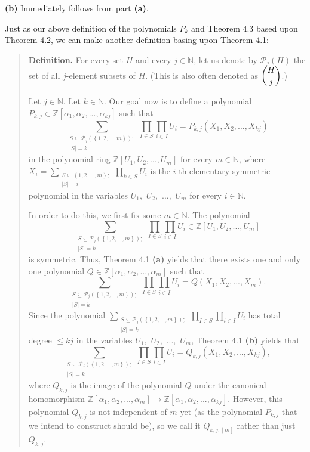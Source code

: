 \documentclass[12pt,final,notitlepage,onecolumn,german]{article}%
\begin{document}
\textbf{(b)} Immediately follows from part \textbf{(a)}.

Just as our above definition of the polynomials $P_{k}$ and Theorem 4.3 based
upon Theorem 4.2, we can make another definition basing upon Theorem 4.1:

\begin{quote}
\textbf{Definition.} For every set $H$ and every $j\in\mathbb{N}$, let us
denote by $\mathcal{P}_{j}\left(  H\right)  $ the set of all $j$-element
subsets of $H.$ (This is also often denoted as $\dbinom{H}{j}$.)

Let $j\in\mathbb{N}$. Let $k\in\mathbb{N}$. Our goal now is to define a
polynomial $P_{k,j}\in\mathbb{Z}\left[  \alpha_{1},\alpha_{2},...,\alpha
_{kj}\right]  $ such that%
\begin{equation}
\sum_{\substack{S\subseteq\mathcal{P}_{j}\left(  \left\{  1,2,...,m\right\}
\right)  ;\\\left\vert S\right\vert =k}}\prod_{I\in S}\prod_{i\in I}%
U_{i}=P_{k,j}\left(  X_{1},X_{2},...,X_{kj}\right)  \label{Pkj1}%
\end{equation}
in the polynomial ring $\mathbb{Z}\left[  U_{1},U_{2},...,U_{m}\right]  $ for
every $m\in\mathbb{N}$, where $X_{i}=\sum\limits_{\substack{S\subseteq\left\{
1,2,...,m\right\}  ;\\\left\vert S\right\vert =i}}\prod\limits_{k\in S}U_{i}$
is the $i$-th elementary symmetric polynomial in the variables $U_{1},$
$U_{2},$ $...,$ $U_{m}$ for every $i\in\mathbb{N}$.

In order to do this, we first fix some $m\in\mathbb{N}$. The polynomial%
\[
\sum_{\substack{S\subseteq\mathcal{P}_{j}\left(  \left\{  1,2,...,m\right\}
\right)  ;\\\left\vert S\right\vert =k}}\prod_{I\in S}\prod_{i\in I}U_{i}%
\in\mathbb{Z}\left[  U_{1},U_{2},...,U_{m}\right]
\]
is symmetric. Thus, Theorem 4.1 \textbf{(a)} yields that there exists one and
only one polynomial $Q\in\mathbb{Z}\left[  \alpha_{1},\alpha_{2}%
,...,\alpha_{m}\right]  $ such that%
\[
\sum_{\substack{S\subseteq\mathcal{P}_{j}\left(  \left\{  1,2,...,m\right\}
\right)  ;\\\left\vert S\right\vert =k}}\prod_{I\in S}\prod_{i\in I}%
U_{i}=Q\left(  X_{1},X_{2},...,X_{m}\right)  .
\]
Since the polynomial $\sum\limits_{\substack{S\subseteq\mathcal{P}_{j}\left(
\left\{  1,2,...,m\right\}  \right)  ;\\\left\vert S\right\vert =k}%
}\prod\limits_{I\in S}\prod\limits_{i\in I}U_{i}$ has total degree $\leq kj$
in the variables $U_{1},$ $U_{2},$ $...,$ $U_{m}$, Theorem 4.1 \textbf{(b)}
yields that%
\[
\sum_{\substack{S\subseteq\mathcal{P}_{j}\left(  \left\{  1,2,...,m\right\}
\right)  ;\\\left\vert S\right\vert =k}}\prod_{I\in S}\prod_{i\in I}%
U_{i}=Q_{k,j}\left(  X_{1},X_{2},...,X_{kj}\right)  ,
\]
where $Q_{k,j}$ is the image of the polynomial $Q$ under the canonical
homomorphism $\mathbb{Z}\left[  \alpha_{1},\alpha_{2},...,\alpha_{m}\right]
\rightarrow\mathbb{Z}\left[  \alpha_{1},\alpha_{2},...,\alpha_{kj}\right]  $.
However, this polynomial $Q_{k,j}$ is not independent of $m$ yet (as the
polynomial $P_{k,j}$ that we intend to construct should be), so we call it
$Q_{k,j,\left[  m\right]  }$ rather than just $Q_{k,j}$.


\end{quote}
\end{document}
